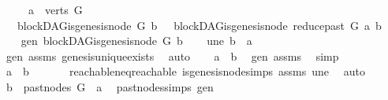 \begin{isabellebody}
\ \ \ \ \ {\isachardoublequoteopen}a\ {\isasymin}\ verts\ G{\isachardoublequoteclose}\isanewline
\ \ \ {\isachardoublequoteopen}blockDAG{\isachardot}{\kern0pt}is{\isacharunderscore}{\kern0pt}genesis{\isacharunderscore}{\kern0pt}node\ G\ b\ {\isasymLongrightarrow}\ \ blockDAG{\isachardot}{\kern0pt}is{\isacharunderscore}{\kern0pt}genesis{\isacharunderscore}{\kern0pt}node\ {\isacharparenleft}{\kern0pt}reduce{\isacharunderscore}{\kern0pt}past\ G\ a{\isacharparenright}{\kern0pt}\ b{\isachardoublequoteclose}\isanewline
%
\isadelimproof
%
\endisadelimproof
%
\isatagproof
{}\isamarkupfalse%
\ {\isacharminus}{\kern0pt}\isanewline
\ \ \isamarkupfalse%
\ gen{\isacharcolon}{\kern0pt}\ {\isachardoublequoteopen}blockDAG{\isachardot}{\kern0pt}is{\isacharunderscore}{\kern0pt}genesis{\isacharunderscore}{\kern0pt}node\ G\ b{\isachardoublequoteclose}\isanewline
\ \ \isamarkupfalse%
\ une{\isacharcolon}{\kern0pt}\ {\isachardoublequoteopen}b\ {\isasymnoteq}\ a{\isachardoublequoteclose}\ \ \isamarkupfalse%
\ gen\ assms{\isacharparenleft}{\kern0pt}{}{\isacharparenright}{\kern0pt}\ genesis{\isacharunderscore}{\kern0pt}unique{\isacharunderscore}{\kern0pt}exists\ \isamarkupfalse%
\ auto\isanewline
\ \ \isamarkupfalse%
\ {\isachardoublequoteopen}a\ {\isasymrightarrow}\isactrlsup {\isacharasterisk}{\kern0pt}\ b{\isachardoublequoteclose}\ \isamarkupfalse%
\ gen\ assms{\isacharparenleft}{\kern0pt}{}{\isacharparenright}{\kern0pt}\ \isamarkupfalse%
\ simp\ \isanewline
\ \ \isamarkupfalse%
\ \isamarkupfalse%
\ {\isachardoublequoteopen}a\ {\isasymrightarrow}\isactrlsup {\isacharplus}{\kern0pt}\ b{\isachardoublequoteclose}\ \isanewline
\ \ \ \ \isamarkupfalse%
\ reachable{\isacharunderscore}{\kern0pt}neq{\isacharunderscore}{\kern0pt}reachable{}\ is{\isacharunderscore}{\kern0pt}genesis{\isacharunderscore}{\kern0pt}node{\isachardot}{\kern0pt}simps\ assms{\isacharparenleft}{\kern0pt}{}{\isacharparenright}{\kern0pt}\ une\ \isamarkupfalse%
\ auto\ \isanewline
\ \ \isamarkupfalse%
\ \isamarkupfalse%
\ {\isachardoublequoteopen}b\ {\isasymin}\ {\isacharparenleft}{\kern0pt}past{\isacharunderscore}{\kern0pt}nodes\ G\ \ a{\isacharparenright}{\kern0pt}{\isachardoublequoteclose}\ \isamarkupfalse%
\ past{\isacharunderscore}{\kern0pt}nodes{\isachardot}{\kern0pt}simps\ gen\ \isamarkupfalse%

\end{isabellebody}
